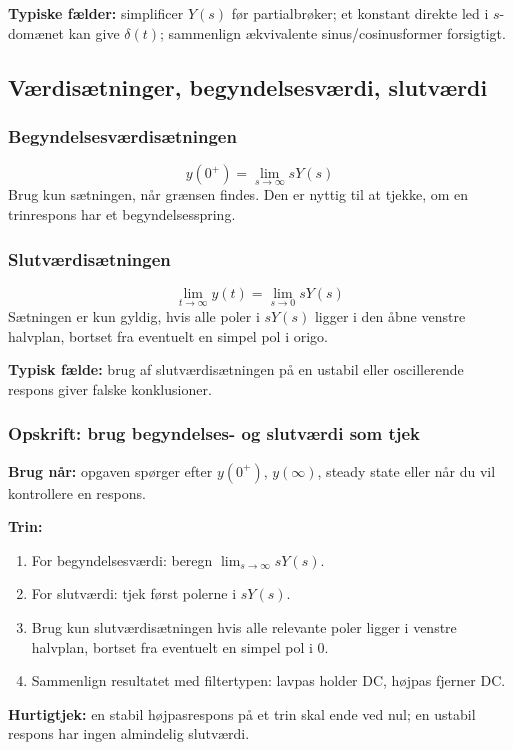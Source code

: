 \textbf{Typiske fælder:} simplificer \(Y(s)\) før partialbrøker; et konstant direkte led i \(s\)-domænet kan give \(\delta(t)\); sammenlign ækvivalente sinus/cosinusformer forsigtigt.

\subsection{Værdisætninger, begyndelsesværdi, slutværdi}

\subsubsection{Begyndelsesværdisætningen}
\[
y(0^+)=\lim_{s\to\infty}sY(s)
\]
Brug kun sætningen, når grænsen findes. Den er nyttig til at tjekke, om en trinrespons har et begyndelsesspring.

\subsubsection{Slutværdisætningen}
\[
\lim_{t\to\infty}y(t)=\lim_{s\to0}sY(s)
\]
Sætningen er kun gyldig, hvis alle poler i \(sY(s)\) ligger i den åbne venstre halvplan, bortset fra eventuelt en simpel pol i origo.

\textbf{Typisk fælde:} brug af slutværdisætningen på en ustabil eller oscillerende respons giver falske konklusioner.

\subsubsection{Opskrift: brug begyndelses- og slutværdi som tjek}
\textbf{Brug når:} opgaven spørger efter \(y(0^+)\), \(y(\infty)\), steady state eller når du vil kontrollere en respons.

\textbf{Trin:}
\begin{enumerate}
    \item For begyndelsesværdi: beregn \(\lim_{s\to\infty}sY(s)\).
    \item For slutværdi: tjek først polerne i \(sY(s)\).
    \item Brug kun slutværdisætningen hvis alle relevante poler ligger i venstre halvplan, bortset fra eventuelt en simpel pol i \(0\).
    \item Sammenlign resultatet med filtertypen: lavpas holder DC, højpas fjerner DC.
\end{enumerate}

\textbf{Hurtigtjek:} en stabil højpasrespons på et trin skal ende ved nul; en ustabil respons har ingen almindelig slutværdi.

